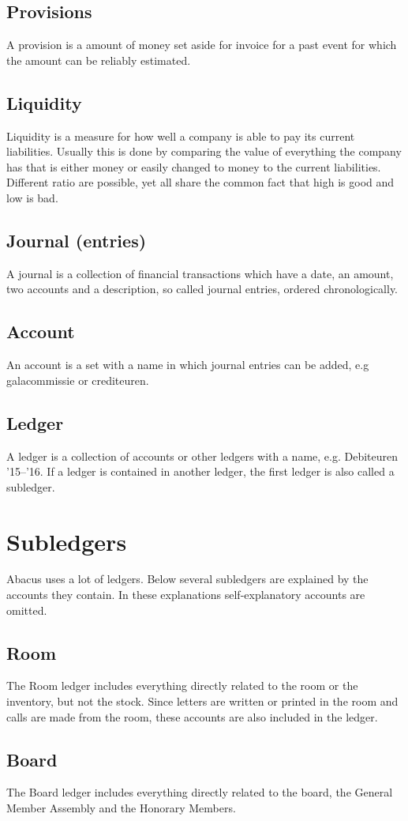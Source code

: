 \documentclass{report}
\begin{document}
\subsection{Provisions}
A provision is a amount of money set aside for invoice for a past event for which the amount can be reliably estimated.
\subsection{Liquidity}
Liquidity is a measure for how well a company is able to pay its current liabilities. Usually this is done by comparing the value of everything the company has that is either money or easily changed to money to the current liabilities. Different ratio are possible, yet all share the common fact that high is good and low is bad.
\subsection{Journal (entries)}
A journal is a collection of financial transactions which have a date, an amount, two accounts and a description, so called journal entries, ordered chronologically.
\subsection{Account}
An account is a set with a name in which journal entries can be added, e.g galacommissie or crediteuren.
\subsection{Ledger}
A ledger is a collection of accounts or other ledgers with a name, e.g. Debiteuren '15--'16. If a ledger is contained in another ledger, the first ledger is also called a subledger.
\section{Subledgers}
Abacus uses a lot of ledgers. Below several subledgers are explained by the accounts they contain. In these explanations self-explanatory accounts are omitted.
\subsection{Room}
The Room ledger includes everything directly related to the room or the inventory, but not the stock. Since letters are written or printed in the room and calls are made from the room, these accounts are also included in the ledger. 
\subsection{Board}
The Board ledger includes everything directly related to the board, the General Member Assembly and the Honorary Members. 
\end{document}
